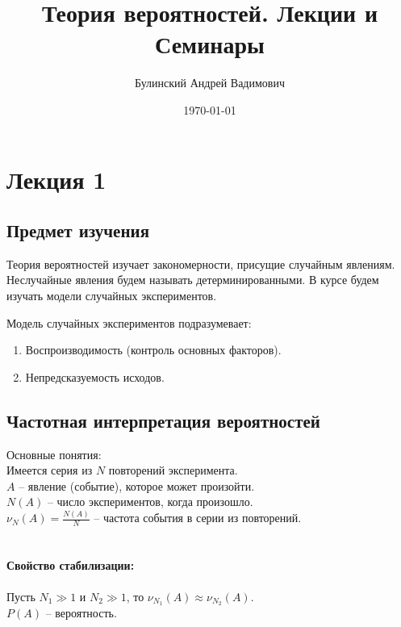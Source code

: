 \documentclass[a4paper, 12pt]{article}
\author{Булинский Андрей Вадимович}
\title{Теория вероятностей. Лекции и Семинары}
\date{\today}
\theoremstyle{definition}
\begin{document}
	\maketitle
	\newpage
	\tableofcontents
	\newpage
	\section{Лекция 1}
	\subsection{Предмет изучения}
	Теория вероятностей изучает закономерности, присущие случайным явлениям. Неслучайные явления будем называть детерминированными. В курсе будем изучать модели случайных экспериментов.\par
	Модель случайных экспериментов подразумевает:
	\begin{enumerate}
		\item Воспроизводимость (контроль основных факторов).
		\item Непредсказуемость исходов.
	\end{enumerate}
	\subsection{Частотная интерпретация вероятностей}
	Основные понятия:\\
	Имеется серия из $N$ повторений эксперимента.\\
	$A$ – явление (событие), которое может произойти.\\
	$N(A)$ – число экспериментов, когда  произошло.\\
	$\nu_N\left(A\right)=\frac{N\left(A\right)}{N}$ – частота события  в серии из  повторений.\\
	\\
	\paragraph{Свойство стабилизации:}
	Пусть $N_1\gg 1$ и $N_2\gg 1$, то $\nu_{N_1}\left(A\right)\approx\nu_{N_2}\left(A\right)$.\\
	$P\left(A\right)$ – вероятность.
\end{document}
